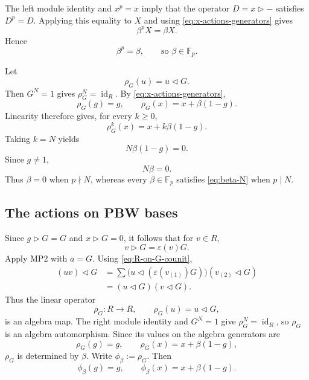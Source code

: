 \documentclass[twoside,11pt]{amsart}
\newcommand{\F}{\mathbb{F}}
\newcommand{\id}{\operatorname{id}}
\begin{document}
	The left module identity and $x^p=x$ imply that the operator
	$D=x\triangleright-$ satisfies $D^p=D$. Applying this equality to $X$ and
	using \eqref{eq:x-actions-generators} gives
	\[
	\beta^pX=\beta X.
	\]
	Hence
	\begin{equation}\label{eq:beta-Fp}
		\beta^p=\beta,
		\qquad\text{so }\beta\in\F_p.
	\end{equation}
	
	Let
	\[
	\rho_G(u)=u\triangleleft G.
	\]
	Then $G^N=1$ gives $\rho_G^N=\id_R$. By
	\eqref{eq:x-actions-generators},
	\[
	\rho_G(g)=g,
	\qquad
	\rho_G(x)=x+\beta(1-g).
	\]
	Linearity therefore gives, for every $k\ge0$,
	\[
	\rho_G^k(x)=x+k\beta(1-g).
	\]
	Taking $k=N$ yields
	\[
	N\beta(1-g)=0.
	\]
	Since $g\ne1$,
	\begin{equation}\label{eq:beta-N}
		N\beta=0.
	\end{equation}
	Thus $\beta=0$ when $p\nmid N$, whereas every $\beta\in\F_p$ satisfies
	\eqref{eq:beta-N} when $p\mid N$.
	
	\subsection{The actions on PBW bases}
	
	Since $g\triangleright G=G$ and $x\triangleright G=0$, it follows that for
	$v\in R$,
	\begin{equation}\label{eq:R-on-G-counit}
		v\triangleright G=\varepsilon(v)G.
	\end{equation}
	Apply MP2 with $a=G$. Using \eqref{eq:R-on-G-counit},
	\[
	\begin{aligned}
		(uv)\triangleleft G
		&=\sum
		\bigl(u\triangleleft(\varepsilon(v_{(1)})G)\bigr)
		(v_{(2)}\triangleleft G)\\
		&=(u\triangleleft G)(v\triangleleft G).
	\end{aligned}
	\]
	Thus the linear operator
	\[
	\rho_G:R\to R,\qquad \rho_G(u)=u\triangleleft G,
	\]
	is an algebra map. The right module identity and $G^N=1$ give
	$\rho_G^N=\id_R$, so $\rho_G$ is an algebra automorphism. Since its values on
	the algebra generators are
	\[
	\rho_G(g)=g,
	\qquad
	\rho_G(x)=x+\beta(1-g),
	\]
	$\rho_G$ is determined by $\beta$. Write $\phi_\beta:=\rho_G$. Then
	\begin{equation}\label{eq:rhoG-phi}
		\phi_\beta(g)=g,
		\qquad
		\phi_\beta(x)=x+\beta(1-g).
	\end{equation}
	
\end{document}
